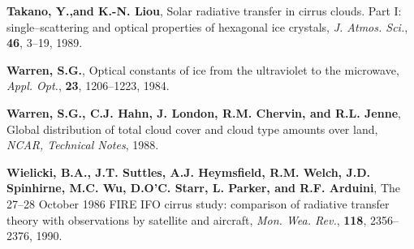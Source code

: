 \documentclass[agp]{svjour}
\begin{document}
\begin{thebibliography}{}
 {\bf Takano, Y.,and K.-N. Liou},
Solar radiative transfer in cirrus clouds. Part I: single--scattering
and optical properties of hexagonal ice crystals, {\it J. Atmos. Sci.},
{\bf 46}, 3--19, 1989.

 {\bf Warren, S.G.}, Optical constants of
ice from the ultraviolet to the microwave, {\it Appl. Opt.}, {\bf 23},
1206--1223, 1984.

 {\bf Warren, S.G., C.J. Hahn, J.
London, R.M. Chervin, and R.L. Jenne}, Global distribution of total
cloud cover and cloud type amounts over land, {\it NCAR, Technical
Notes}, 1988.

 {\bf Wielicki, B.A., J.T. Suttles,
A.J. Heymsfield, R.M. Welch, J.D. Spinhirne, M.C. Wu, D.O'C. Starr, L.
Parker, and R.F. Arduini}, The 27--28 October 1986 FIRE IFO cirrus
study: comparison of radiative transfer theory with observations by
satellite and aircraft, {\it Mon. Wea. Rev.}, {\bf 118}, 2356--2376,
1990.

\end{thebibliography}
\end{document}
